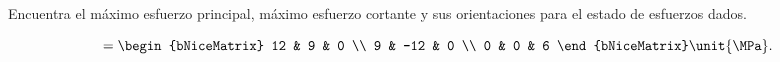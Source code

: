 \documentclass[../main.tex]{subfiles}
\begin{document}
\begin{problema}
	Encuentra el máximo esfuerzo principal, máximo esfuerzo cortante y
	sus orientaciones para el estado de esfuerzos dados.

	\begin{equation*}
		[\sigma] = \begin{bNiceMatrix}
			12 & 9   & 0 \\
			9  & -12 & 0 \\
			0  & 0   & 6
		\end{bNiceMatrix}
		\unit{\MPa}.
	\end{equation*}
\end{problema}
\end{document}
